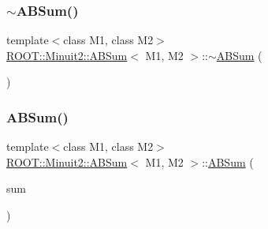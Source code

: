 \subsubsection{\texorpdfstring{$\sim$ABSum()}{~ABSum()}\hspace{0.1cm}{\footnotesize\ttfamily [2/3]}}
{\footnotesize\ttfamily template$<$class M1, class M2$>$ \\
\mbox{\hyperlink{classROOT_1_1Minuit2_1_1ABSum}{R\+O\+O\+T\+::\+Minuit2\+::\+A\+B\+Sum}}$<$ M1, M2 $>$\+::$\sim$\mbox{\hyperlink{classROOT_1_1Minuit2_1_1ABSum}{A\+B\+Sum}} (\begin{DoxyParamCaption}{ }\end{DoxyParamCaption})\hspace{0.3cm}{\ttfamily [inline]}}

\mbox{\label{classROOT_1_1Minuit2_1_1ABSum_ae687b46f660f6db5ca9c4626fd5e5a4b}} 
\subsubsection{\texorpdfstring{ABSum()}{ABSum()}\hspace{0.1cm}{\footnotesize\ttfamily [5/9]}}
{\footnotesize\ttfamily template$<$class M1, class M2$>$ \\
\mbox{\hyperlink{classROOT_1_1Minuit2_1_1ABSum}{R\+O\+O\+T\+::\+Minuit2\+::\+A\+B\+Sum}}$<$ M1, M2 $>$\+::\mbox{\hyperlink{classROOT_1_1Minuit2_1_1ABSum}{A\+B\+Sum}} (\begin{DoxyParamCaption}\item[{const \mbox{\hyperlink{classROOT_1_1Minuit2_1_1ABSum}{A\+B\+Sum}}$<$ M1, M2 $>$ \&}]{sum }\end{DoxyParamCaption})\hspace{0.3cm}{\ttfamily [inline]}}

\mbox{\label{classROOT_1_1Minuit2_1_1ABSum_a4f9776ad68bfb91ccf613b367ecf6730}} 
